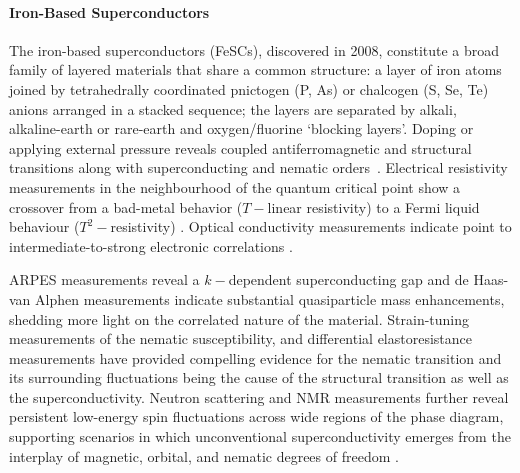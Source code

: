 \paragraph{Iron-Based Superconductors}
The iron-based superconductors (FeSCs), discovered in 2008, constitute a broad family of layered materials that share a common structure: a layer of iron atoms joined by tetrahedrally coordinated pnictogen (P, As) or chalcogen (S, Se, Te) anions arranged in a stacked sequence; the layers are separated by alkali, alkaline-earth or rare-earth and oxygen/fluorine ‘blocking layers’\cite{kamihara2008,Paglione2010,Hirschfeld2011,stewart2011}. Doping or applying external pressure reveals coupled antiferromagnetic and structural transitions along with superconducting and nematic orders~\cite{Johnston2010,Kasahara2012,Fernandes2014}. Electrical resistivity measurements in the neighbourhood of the quantum critical point show a crossover from a bad-metal behavior (\(T-\)linear resistivity)  to a Fermi liquid behaviour (\(T^2-\)resistivity) \cite{Analytis2014}. Optical conductivity measurements indicate point to intermediate-to-strong electronic correlations \cite{Qazilbash2009}.

ARPES measurements reveal a \(k-\)dependent superconducting gap and de Haas-van Alphen measurements indicate substantial quasiparticle mass enhancements, shedding more light on the correlated nature of the material\cite{Shishido2010,terashima2009}. Strain-tuning measurements of the nematic susceptibility, and differential elastoresistance measurements have provided compelling evidence for the nematic transition and its surrounding fluctuations being the cause of the structural transition as well as the superconductivity\cite{Chu2012,Kuo2016}. Neutron scattering and NMR measurements further reveal persistent low-energy spin fluctuations across wide regions of the phase diagram, supporting scenarios in which unconventional superconductivity emerges from the interplay of magnetic, orbital, and nematic degrees of freedom \cite{Inosov2010,Chubukov2012}.

